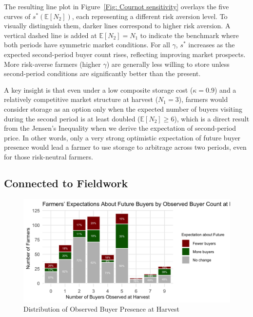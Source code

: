 The resulting line plot in Figure~\ref{Fig: Cournot sensitivity} overlays the five curves of $s^*(\mathbb{E}[N_2])$, each representing a different risk aversion level. To visually distinguish them, darker lines correspond to higher risk aversion. A vertical dashed line is added at $\mathbb{E}[N_2] = N_1$ to indicate the benchmark where both periods have symmetric market conditions. For all $\gamma$, $s^*$ increases as the expected second-period buyer count rises, reflecting improving market prospects. More risk-averse farmers (higher $\gamma$) are generally less willing to store unless second-period conditions are significantly better than the present.

A key insight is that even under a low composite storage cost ($\kappa=0.9$) and a relatively competitive market structure at harvest ($N_1=3$), farmers would consider storage as an option only when the expected number of buyers visiting during the second period is at least doubled ($\mathbb{E}[N_2]\geq 6$), which is a direct result from the Jensen's Inequality when we derive the expectation of second-period price. In other words, only a very strong optimistic expectation of future buyer presence would lead a farmer to use storage to arbitrage across two periods, even for those risk-neutral farmers. 





\subsection{Connected to Fieldwork}



\begin{figure}[hpt]
\centering
\includegraphics[width=\textwidth]{figures/buyer_count_distribution.png}
\caption{Distribution of Observed Buyer Presence at Harvest}
\label{Figure: buyer count at harvest}
\end{figure}





